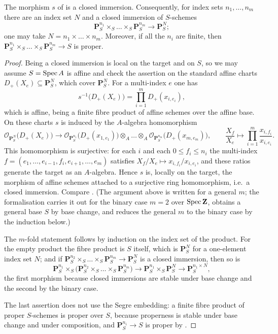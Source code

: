 \begin{lemma}\label{lem:chow-segre}
\leanok
The morphism $s$ of  is a closed immersion.  Consequently,
for index sets $n_1,\dots,n_m$ there are an index set $N$ and a closed
immersion of $S$-schemes
\[
  \mathbf P^{n_1}_S\times_S\dots\times_S\mathbf P^{n_m}_S
  \longrightarrow\mathbf P^{N}_S ;
\]
one may take $N=n_1\times\dots\times n_m$.  Moreover, if all the $n_i$ are
finite, then $\mathbf P^{n_1}_S\times_S\dots\times_S\mathbf P^{n_m}_S\to S$ is
proper.
\end{lemma}
\begin{proof}
\leanok
Being a closed immersion is local on the target and on $S$, so we may assume
$S=\operatorname{Spec} A$ is affine and check the assertion on the standard affine charts
$D_+(X_e)\subseteq\mathbf P^N_S$, which cover $\mathbf P^N_S$.  For a
multi-index $e$ one has
\[
  s^{-1}\bigl(D_+(X_e)\bigr)=\prod_{i=1}^m D_+(x_{i,e_i}),
\]
which is affine, being a finite fibre product of affine schemes over the affine
base.  On these charts $s$ is induced by the $A$-algebra homomorphism
\[
  \mathcal O_{\mathbf P^N_S}\bigl(D_+(X_e)\bigr)
  \longrightarrow
  \mathcal O_{\mathbf P^{n_1}_S}\bigl(D_+(x_{1,e_1})\bigr)\otimes_A\dots
  \otimes_A\mathcal O_{\mathbf P^{n_m}_S}\bigl(D_+(x_{m,e_m})\bigr),
  \qquad
  \frac{X_f}{X_e}\longmapsto\prod_{i=1}^m\frac{x_{i,f_i}}{x_{i,e_i}}.
\]
This homomorphism is surjective: for each $i$ and each $0\leq f_i\leq n_i$ the
multi-index $f=(e_1,\dots,e_{i-1},f_i,e_{i+1},\dots,e_m)$ satisfies
$X_f/X_e\mapsto x_{i,f_i}/x_{i,e_i}$, and these ratios generate the target as
an $A$-algebra.  Hence $s$ is, locally on the target, the morphism of affine
schemes attached to a surjective ring homomorphism, i.e.\ a closed immersion.
Compare .  (The argument above is written for a general
$m$; the formalisation carries it out for the binary case $m=2$ over
$\operatorname{Spec}\mathbf Z$, obtains a general base $S$ by base change, and reduces the
general $m$ to the binary case by the induction below.)

The $m$-fold statement follows by induction on the index set of the product.
For the empty product the fibre product is $S$ itself, which is
$\mathbf P^{N}_S$ for a one-element index set $N$; and if
$\mathbf P^{n_2}_S\times_S\dots\times_S\mathbf P^{n_m}_S\to\mathbf P^{N}_S$ is
a closed immersion, then so is
\[
  \mathbf P^{n_1}_S\times_S\bigl(\mathbf P^{n_2}_S\times_S\dots\times_S
  \mathbf P^{n_m}_S\bigr)
  \longrightarrow\mathbf P^{n_1}_S\times_S\mathbf P^{N}_S
  \longrightarrow\mathbf P^{n_1\times N}_S,
\]
the first morphism because closed immersions are stable under base change and
the second by the binary case.

The last assertion does not use the Segre embedding: a finite fibre product of
proper $S$-schemes is proper over $S$, because properness is stable under base
change and under composition, and $\mathbf P^{n_i}_S\to S$ is proper by
.
\end{proof}


